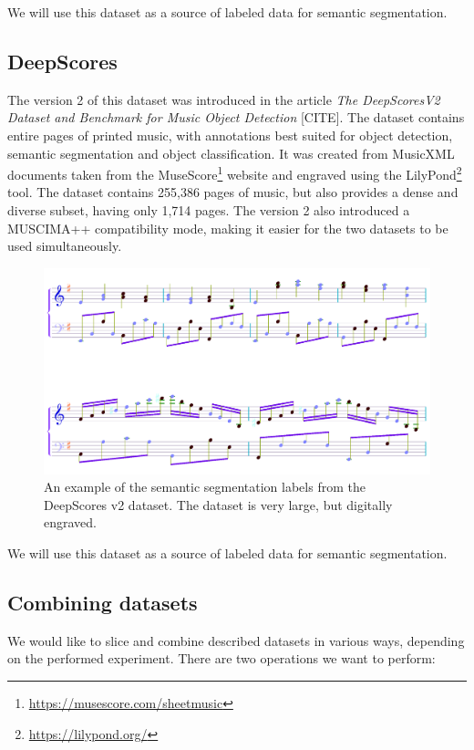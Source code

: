 We will use this dataset as a source of labeled data for semantic segmentation.


\subsection{DeepScores}

The version 2 of this dataset was introduced in the article \emph{The DeepScoresV2 Dataset and Benchmark for Music Object Detection} [CITE]. The dataset contains entire pages of printed music, with annotations best suited for object detection, semantic segmentation and object classification. It was created from MusicXML documents taken from the MuseScore\footnote{\url{https://musescore.com/sheetmusic}} website and engraved using the LilyPond\footnote{\url{https://lilypond.org/}} tool. The dataset contains 255,386 pages of music, but also provides a dense and diverse subset, having only 1,714 pages. The version 2 also introduced a MUSCIMA++ compatibility mode, making it easier for the two datasets to be used simultaneously.

\begin{figure}[ht]
    \centering
    \includegraphics[width=140mm]{../img/deepscores.png}
    \caption{An example of the semantic segmentation labels from the DeepScores v2 dataset. The dataset is very large, but digitally engraved.}
    \label{fig:DeepScoresV2}
\end{figure}

We will use this dataset as a source of labeled data for semantic segmentation.


\subsection{Combining datasets}

We would like to slice and combine described datasets in various ways, depending on the performed experiment. There are two operations we want to perform:


